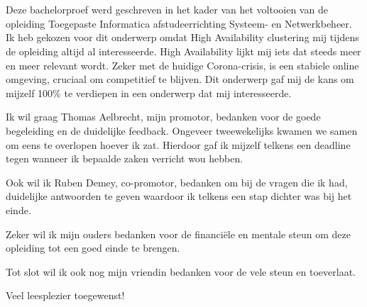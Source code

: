
\chapter*{}
\label{ch:voorwoord}

Deze bachelorproef werd geschreven in het kader van het voltooien van de opleiding Toegepaste Informatica afstudeerrichting Systeem- en Netwerkbeheer. Ik heb gekozen voor dit onderwerp omdat High Availability clustering mij tijdens de opleiding altijd al interesseerde. High Availability lijkt mij iets dat steeds meer en meer relevant wordt. Zeker met de huidige Corona-crisis, is een stabiele online omgeving, cruciaal om competitief te blijven. Dit onderwerp gaf mij de kans om mijzelf 100\% te verdiepen in een onderwerp dat mij interesseerde.

Ik wil graag Thomas Aelbrecht, mijn promotor, bedanken voor de goede begeleiding en de duidelijke feedback. Ongeveer tweewekelijks kwamen we samen om eens te overlopen hoever ik zat. Hierdoor gaf ik mijzelf telkens een deadline tegen wanneer ik bepaalde zaken verricht wou hebben.

Ook wil ik Ruben Demey, co-promotor, bedanken om bij de vragen die ik had, duidelijke antwoorden te geven waardoor ik telkens een stap dichter was bij het einde.

Zeker wil ik mijn ouders bedanken voor de financiële en mentale steun om deze opleiding tot een goed einde te brengen.

Tot slot wil ik ook nog mijn vriendin bedanken voor de vele steun en toeverlaat.

Veel leesplezier toegewenst!